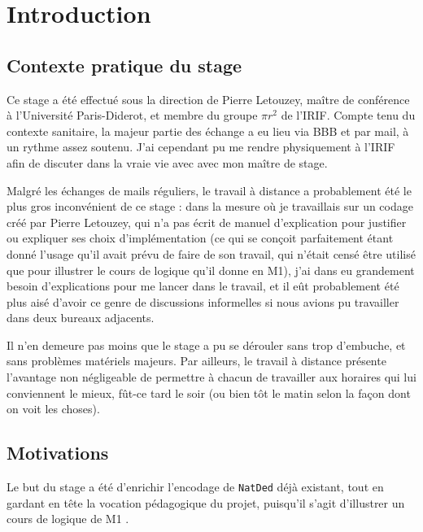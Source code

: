 \documentclass[a4paper]{article}
\theoremstyle{remark}
\theoremstyle{remark}
\theoremstyle{remark}
\theoremstyle{definition}
\theoremstyle{definition}
\theoremstyle{definition}
\begin{document}
\renewcommand{\contentsname}{\centerline{Table des matières} \vspace*{-2em}}
\tableofcontents

\newpage

\section{Introduction}

\subsection{Contexte pratique du stage}

Ce stage a été effectué sous la direction de Pierre Letouzey, maître de conférence à l'Université Paris-Diderot, et membre du groupe $\pi r^2$ de l'IRIF. Compte tenu du contexte sanitaire, la majeur partie des échange a eu lieu via BBB et par mail, à un rythme assez soutenu. J'ai cependant pu me rendre physiquement à l'IRIF afin de discuter dans la vraie vie avec avec mon maître de stage.

Malgré les échanges de mails réguliers, le travail à distance a probablement été le plus gros inconvénient de ce stage : dans la mesure où je travaillais sur un codage créé par Pierre Letouzey, qui n'a pas écrit de manuel d'explication pour justifier ou expliquer ses choix d'implémentation (ce qui se conçoit parfaitement étant donné l'usage qu'il avait prévu de faire de son travail, qui n'était censé être utilisé que pour illustrer le cours de logique qu'il donne en M1), j'ai dans eu grandement besoin d'explications pour me lancer dans le travail, et il eût probablement été plus aisé d'avoir ce genre de discussions informelles si nous avions pu travailler dans deux bureaux adjacents.

Il n'en demeure pas moins que le stage a pu se dérouler sans trop d'embuche, et sans problèmes matériels majeurs. Par ailleurs, le travail à distance présente l'avantage non négligeable de permettre à chacun de travailler aux horaires qui lui conviennent le mieux, fût-ce tard le soir (ou bien tôt le matin selon la façon dont on voit les choses).

\subsection{Motivations}

Le but du stage a été d'enrichir l'encodage de \verb+NatDed+ déjà existant, tout en gardant en tête la vocation pédagogique du projet, puisqu'il s'agit d'illustrer un cours de logique de M1 \cite{poly}.
\end{document}
